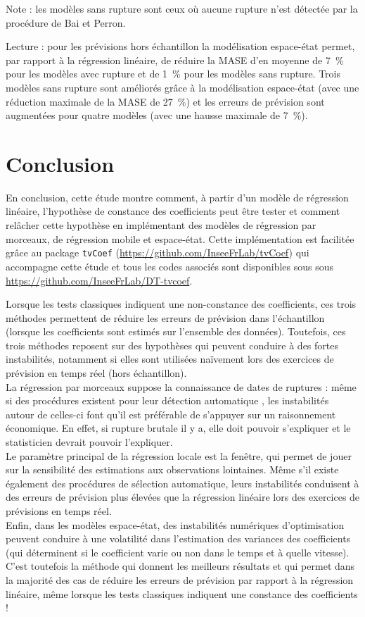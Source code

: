 \documentclass[
  a4paper,
  DIV=11,
  numbers=noendperiod,
  french]{scrartcl}
\newcommand\1{{\mathds 1}}
\theoremstyle{remark}
\begin{document}
Note : les modèles sans rupture sont ceux où aucune rupture n'est
détectée par la procédure de Bai et Perron.

Lecture : pour les prévisions hors échantillon la modélisation
espace-état permet, par rapport à la régression linéaire, de réduire la
MASE d'en moyenne de 7~\% pour les modèles avec rupture et de 1~\% pour
les modèles sans rupture. Trois modèles sans rupture sont améliorés
grâce à la modélisation espace-état (avec une réduction maximale de la
MASE de 27~\%) et les erreurs de prévision sont augmentées pour quatre
modèles (avec une hausse maximale de 7~\%).

\section{Conclusion}\label{conclusion}

En conclusion, cette étude montre comment, à partir d'un modèle de
régression linéaire, l'hypothèse de constance des coefficients peut être
tester et comment relâcher cette hypothèse en implémentant des modèles
de régression par morceaux, de régression mobile et espace-état. Cette
implémentation est facilitée grâce au package \texttt{tvCoef}
(\url{https://github.com/InseeFrLab/tvCoef}) qui accompagne cette étude
et tous les codes associés sont disponibles sous sous
\url{https://github.com/InseeFrLab/DT-tvcoef}.

Lorsque les tests classiques indiquent une non-constance des
coefficients, ces trois méthodes permettent de réduire les erreurs de
prévision dans l'échantillon (lorsque les coefficients sont estimés sur
l'ensemble des données). Toutefois, ces trois méthodes reposent sur des
hypothèses qui peuvent conduire à des fortes instabilités, notamment si
elles sont utilisées naïvement lors des exercices de prévision en temps
réel (hors échantillon).\\
La régression par morceaux suppose la connaissance de dates de ruptures
: même si des procédures existent pour leur détection automatique
\autocite{bai2003computation}, les instabilités autour de celles-ci font
qu'il est préférable de s'appuyer sur un raisonnement économique. En
effet, si rupture brutale il y a, elle doit pouvoir s'expliquer et le
statisticien devrait pouvoir l'expliquer.\\
Le paramètre principal de la régression locale est la fenêtre, qui
permet de jouer sur la sensibilité des estimations aux observations
lointaines. Même s'il existe également des procédures de sélection
automatique, leurs instabilités conduisent à des erreurs de prévision
plus élevées que la régression linéaire lors des exercices de prévisions
en temps réel.\\
Enfin, dans les modèles espace-état, des instabilités numériques
d'optimisation peuvent conduire à une volatilité dans l'estimation des
variances des coefficients (qui déterminent si le coefficient varie ou
non dans le temps et à quelle vitesse). C'est toutefois la méthode qui
donnent les meilleurs résultats et qui permet dans la majorité des cas
de réduire les erreurs de prévision par rapport à la régression
linéaire, même lorsque les tests classiques indiquent une constance des
coefficients !
\end{document}
